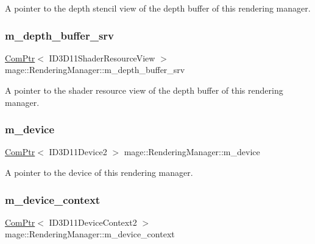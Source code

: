 A pointer to the depth stencil view of the depth buffer of this rendering manager. \hypertarget{classmage_1_1_rendering_manager_a224a29e5f6befd5079f8303351cf30ae}{}\label{classmage_1_1_rendering_manager_a224a29e5f6befd5079f8303351cf30ae} 
\subsubsection{\texorpdfstring{m\+\_\+depth\+\_\+buffer\+\_\+srv}{m\_depth\_buffer\_srv}}
{\footnotesize\ttfamily \hyperlink{namespacemage_ae74f374780900893caa5555d1031fd79}{Com\+Ptr}$<$ I\+D3\+D11\+Shader\+Resource\+View $>$ mage\+::\+Rendering\+Manager\+::m\+\_\+depth\+\_\+buffer\+\_\+srv\hspace{0.3cm}{\ttfamily [private]}}

A pointer to the shader resource view of the depth buffer of this rendering manager. \hypertarget{classmage_1_1_rendering_manager_a565560e08553cc8414ec09901273275e}{}\label{classmage_1_1_rendering_manager_a565560e08553cc8414ec09901273275e} 
\subsubsection{\texorpdfstring{m\+\_\+device}{m\_device}}
{\footnotesize\ttfamily \hyperlink{namespacemage_ae74f374780900893caa5555d1031fd79}{Com\+Ptr}$<$ I\+D3\+D11\+Device2 $>$ mage\+::\+Rendering\+Manager\+::m\+\_\+device\hspace{0.3cm}{\ttfamily [private]}}

A pointer to the device of this rendering manager. \hypertarget{classmage_1_1_rendering_manager_aac3b31f3e3ba242d3cd6d7551538021f}{}\label{classmage_1_1_rendering_manager_aac3b31f3e3ba242d3cd6d7551538021f} 
\subsubsection{\texorpdfstring{m\+\_\+device\+\_\+context}{m\_device\_context}}
{\footnotesize\ttfamily \hyperlink{namespacemage_ae74f374780900893caa5555d1031fd79}{Com\+Ptr}$<$ I\+D3\+D11\+Device\+Context2 $>$ mage\+::\+Rendering\+Manager\+::m\+\_\+device\+\_\+context\hspace{0.3cm}{\ttfamily [private]}}


